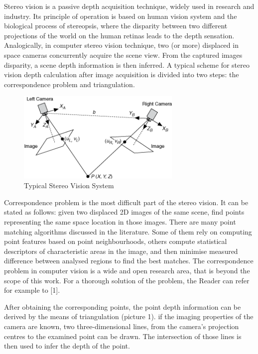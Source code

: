 Stereo vision is a passive depth acquisition technique, widely used in research and  industry. Its principle of operation is based on human vision system and the biological process of stereopsis, where the disparity between two different projections of the world on the human retinas leads to the depth sensation. Analogically, in computer stereo vision technique, two (or more) displaced in space cameras concurrently acquire the scene view. From the captured images disparity, a scene depth information is then inferred. A typical scheme for stereo vision depth calculation after image acquisition is divided into two steps: the correspondence problem and triangulation.

\begin{figure}[H]
\label{fig:stereo}
\centering
\includegraphics[width=0.7\textwidth]{fig/stereovision}
\caption{Typical Stereo Vision System}
\end{figure}

Correspondence problem is the most difficult part of the stereo vision. It can be stated as follows: given two displaced 2D images of the same scene, find points representing the same space location in those images. There are many point matching algorithms discussed in the literature. Some of them rely on computing point features based on point neighbourhoods, others compute statistical descriptors of characteristic areas in the image, and then minimise measured difference between analysed regions to find the best matches. The correspondence problem in computer vision is a wide and open research area, that is beyond the scope of this work. For a thorough solution of the problem, the Reader can refer for example to [1].

After obtaining the corresponding points, the point depth information can be derived by the means of triangulation (picture 1). if the imaging properties of the camera are known, two three-dimensional lines, from the camera's projection centres to the examined point can be drawn. The intersection of those lines is then used to infer the depth of the point. 

